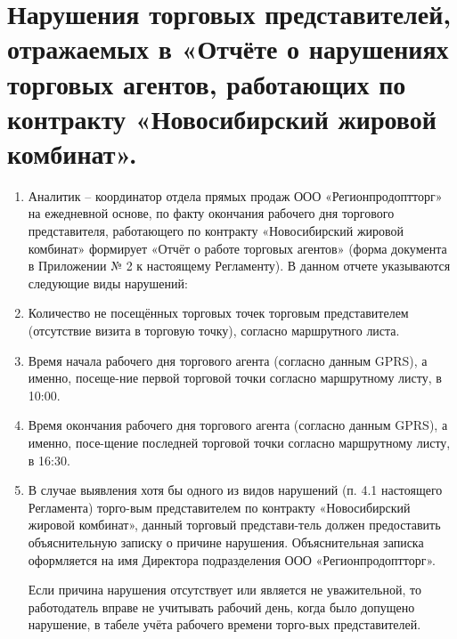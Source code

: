 \section{Нарушения торговых представителей, отражаемых в «Отчёте о нарушениях торговых агентов, работающих по контракту «Новосибирский жировой комбинат».}
\begin{enumerate}[\thesection .1]
\item Аналитик – координатор отдела прямых продаж ООО «Регионпродоптторг» на ежедневной основе, по факту окончания рабочего дня торгового представителя, работающего по контракту «Новосибирский жировой комбинат» формирует «Отчёт о работе торговых агентов» (форма документа в Приложении № 2 к настоящему Регламенту). В данном отчете указываются следующие виды нарушений:	

\item Количество не посещённых торговых точек торговым представителем (отсутствие визита в торговую точку), согласно маршрутного листа.

\item Время начала рабочего дня торгового агента (согласно данным GPRS), а именно, посеще-ние первой торговой точки согласно маршрутному листу, в 10:00. 

\item Время окончания рабочего дня торгового агента (согласно данным GPRS), а именно, посе-щение последней торговой точки согласно маршрутному листу, в 16:30.

\item В случае выявления хотя бы одного из видов нарушений (п. 4.1 настоящего Регламента) торго-вым представителем по контракту «Новосибирский жировой комбинат», данный торговый представи-тель должен предоставить объяснительную записку о причине нарушения. Объяснительная записка оформляется на имя Директора подразделения ООО «Регионпродоптторг». 

Если причина нарушения отсутствует или является не уважительной, то работодатель вправе не учитывать рабочий день, когда было допущено нарушение, в табеле учёта рабочего времени торго-вых представителей.	
\end{enumerate}
